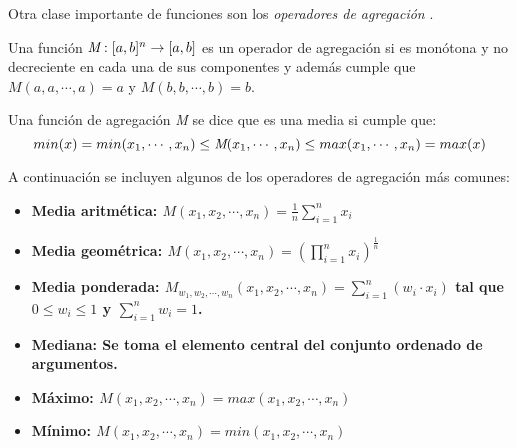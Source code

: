 Otra clase importante de funciones son los \emph{operadores de agregación} \cite{calvo2002aggregation, beliakov2007aggregation}.
\begin{definition}
Una función $\emph{M} : [a,b]^{n} \rightarrow [a,b]$ es un operador de agregación si es monótona y no decreciente en cada una de sus componentes y además cumple que $M(a, a, \cdots,a) = a$ y $M(b, b, \cdots,b) = b$.
\end{definition}
\begin{definition}
Una función de agregación \emph{M} se dice que es una media si cumple que:
\begin{equation}\label{def:mean-aggregation-operator}
min(x) = min(x_{1},\cdots,x_{n})\leq \emph{M}(x_{1},\cdots,x_{n}) \leq max(x_{1},\cdots,x_{n}) = max(x)
\end{equation}
\end{definition}
A continuación se incluyen algunos de los operadores de agregación más comunes:
\begin{itemize}
	\item \bfseries Media aritmética: $M(x_{1},x_{2},\cdots,x_{n}) = \frac{1}{n}\sum\limits_{i=1}^{n}x_{i}$
	\item \bfseries Media geométrica: $M(x_{1},x_{2},\cdots,x_{n}) = (\prod\limits_{i=1}^{n}x_{i})^{\frac{1}{n}}$
	\item \bfseries Media ponderada: $M_{w_{1},w_{2},\cdots,w_{n}}(x_{1},x_{2},\cdots,x_{n}) =\sum\limits_{i=1}^{n}(w_{i}\cdot x_{i})$ \normalfont tal que $0 \leq w_{i} \leq 1$ y $\sum\limits_{i=1}^{n}w_{i} = 1$.
	\item \bfseries Mediana: \normalfont Se toma el elemento central del conjunto ordenado de argumentos.
	\item \bfseries Máximo: $M(x_{1},x_{2},\cdots,x_{n}) = max(x_{1},x_{2},\cdots,x_{n})$
	\item \bfseries Mínimo: $M(x_{1},x_{2},\cdots,x_{n}) = min(x_{1},x_{2},\cdots,x_{n})$
\end{itemize}

